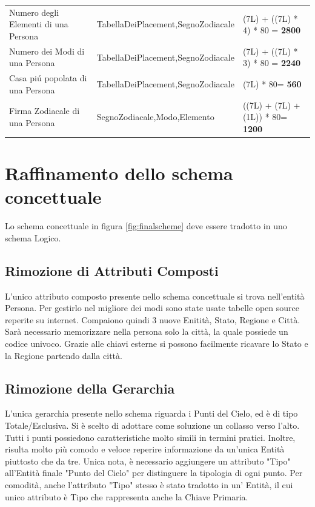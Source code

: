 {\begin{longtable}{ |p{3cm}|p{4cm}|p{4.5cm}|}
Numero degli Elementi di una Persona & TabellaDeiPlacement,\newline SegnoZodiacale & (7L) + ((7L) * 4) * 80 = \textbf{2800}\\
Numero dei Modi di una Persona & TabellaDeiPlacement,\newline SegnoZodiacale & (7L) + ((7L) * 3) * 80 = \textbf{2240}\\
Casa piú popolata di una Persona & TabellaDeiPlacement,\newline SegnoZodiacale & (7L) * 80= \textbf{560}\\
\hline
Firma Zodiacale di una Persona & SegnoZodiacale,\newline Modo,\newline Elemento & ((7L) + (7L) + (1L)) * 80= \textbf{1200}\\
\hline
\end{longtable}
}

\section{Raffinamento dello schema concettuale}
Lo schema concettuale in figura \ref{fig:finalscheme} deve essere tradotto in uno schema Logico.\newline
\subsection{Rimozione di Attributi Composti}
L'unico attributo composto presente nello schema concettuale si trova nell'entità Persona.\newline
Per gestirlo nel migliore dei modi sono state usate tabelle open source reperite su internet. Compaiono quindi 3 nuove Enitità, Stato, Regione e Città. Sarà necessario memorizzare nella persona solo la città, la quale possiede un codice univoco. Grazie alle chiavi esterne si possono facilmente ricavare lo Stato e la Regione partendo dalla città.
\subsection{Rimozione della Gerarchia}
L'unica gerarchia presente nello schema riguarda i Punti del Cielo, ed è di tipo Totale/Esclusiva.\newline
Si è scelto di adottare come soluzione un collasso verso l'alto. Tutti i punti possiedono caratteristiche molto simili in termini pratici. Inoltre, risulta molto più comodo e veloce reperire informazione da un'unica Entità piuttosto che da tre.\newline
Unica nota, è necessario aggiungere un attributo "Tipo" all'Entità finale "Punto del Cielo" per distinguere la tipologia di ogni punto. Per comodità, anche l'attributo "Tipo" stesso è stato tradotto in un' Entità, il cui unico attributo è Tipo che rappresenta anche la Chiave Primaria.
